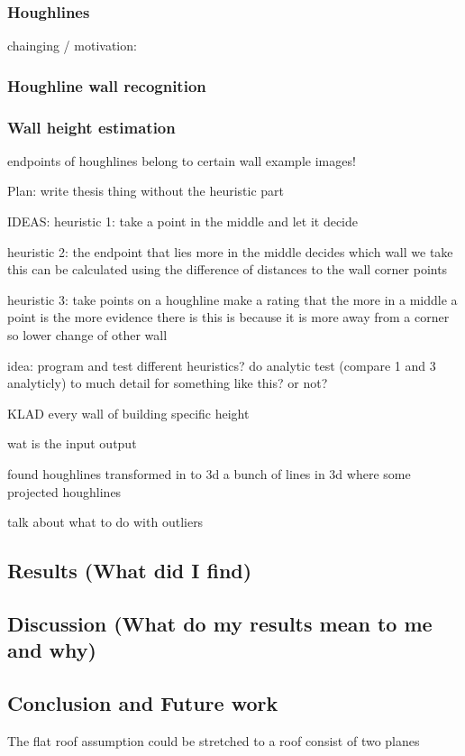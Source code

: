 \subsubsection{Houghlines}
	chainging / motivation:


\subsubsection{Houghline wall recognition}
\subsubsection{Wall height estimation}




endpoints of houghlines belong to certain wall
example images!


Plan:
write thesis thing without the heuristic part

IDEAS:
heuristic 1:
take a point in the middle and let it decide

heuristic 2:
the endpoint that lies more in the middle decides which wall we take
this can be calculated using the difference of distances to the wall corner points

heuristic 3:
take points on a houghline
make a rating that the more in a middle a point is the more evidence there is
this is because it is more away from a corner so lower change of other wall

idea:
program and test different heuristics?
do analytic test (compare 1 and 3 analyticly)
	to much detail for something like this? or not?


KLAD
every wall of building specific height


wat is the input
output

found houghlines transformed in to 3d
a bunch of lines in 3d where some
projected houghlines


talk about
what to do with outliers

\subsection{Results (What did I find)}
\subsection{Discussion (What do my results mean to me and why)}
\subsection{Conclusion and Future work}
The flat roof assumption could be stretched to a roof consist of two planes



